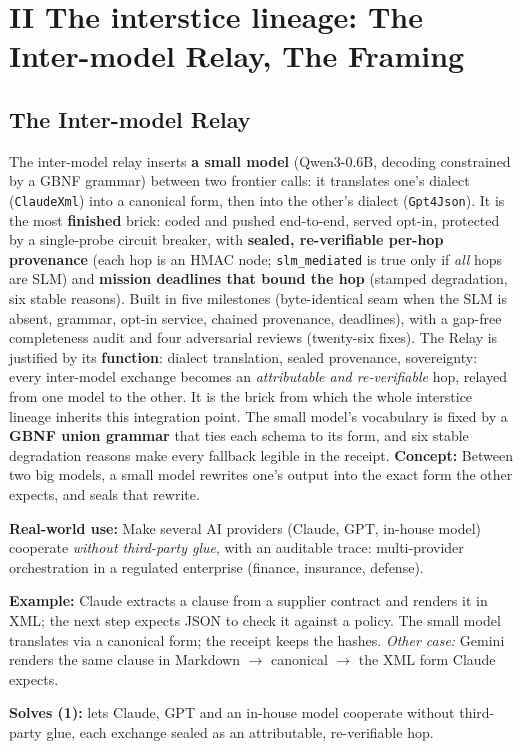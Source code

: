 \documentclass[11pt]{article}
\newcommand{\concept}[1]{{\color{efenavy}\textbf{Concept:} }#1\par}
\newcommand{\exemple}[1]{{\color{efeamber}\textbf{Example:} }#1\par}
\newcommand{\utilite}[1]{{\color{efeplum}\textbf{Real-world use:} }#1\par}
\newcommand{\solves}[2]{{\color{efesolve}\textbf{Solves #1:} }#2\par}
\begin{document}
\section{II \;\textbar\; The interstice lineage: The Inter-model Relay, The Framing}

\subsection{The Inter-model Relay}
The inter-model relay inserts \textbf{a small model} (Qwen3-0.6B, decoding constrained by a GBNF
grammar) between two frontier calls: it translates one's dialect (\texttt{ClaudeXml}) into a
canonical form, then into the other's dialect (\texttt{Gpt4Json}). It is the most \textbf{finished}
brick: coded and pushed end-to-end, served opt-in, protected by a single-probe circuit breaker, with
\textbf{sealed, re-verifiable per-hop provenance} (each hop is an HMAC node; \texttt{slm\_mediated}
is true only if \emph{all} hops are SLM) and \textbf{mission deadlines that bound the hop} (stamped
degradation, six stable reasons). Built in five milestones (byte-identical seam when the SLM is
absent, grammar, opt-in service, chained provenance, deadlines), with a gap-free completeness audit
and four adversarial reviews (twenty-six fixes).
The Relay is justified by its \textbf{function}: dialect translation, sealed provenance, sovereignty: every inter-model exchange becomes an \emph{attributable and re-verifiable} hop, relayed from one
model to the other. It is the brick from which the whole interstice lineage inherits this integration
point. The small model's vocabulary is fixed by a \textbf{GBNF union grammar} that ties each schema
to its form, and six stable degradation reasons make every fallback legible in the receipt.
\concept{Between two big models, a small model rewrites one's output into the exact form the other
expects, and seals that rewrite.}
\utilite{Make several AI providers (Claude, GPT, in-house model) cooperate \emph{without third-party
glue}, with an auditable trace: multi-provider orchestration in a regulated enterprise (finance,
insurance, defense).}
\exemple{Claude extracts a clause from a supplier contract and renders it in XML; the next step
expects JSON to check it against a policy. The small model translates via a canonical form; the
receipt keeps the hashes. \emph{Other case:} Gemini renders the same clause in Markdown
$\rightarrow$ canonical $\rightarrow$ the XML form Claude expects.}
\solves{(1)}{lets Claude, GPT and an in-house model cooperate without third-party glue, each exchange sealed as an attributable, re-verifiable hop.}
\end{document}
